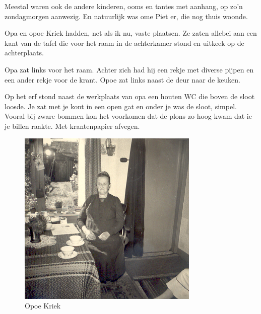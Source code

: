 \documentclass[12pt,twoside]{memoir}
\begin{document}
Meestal waren ook de andere kinderen, ooms en tantes met aanhang, op zo’n zondagmorgen aanwezig. En natuurlijk was ome Piet er, die nog thuis woonde. 

Opa en opoe Kriek hadden, net als ik nu, vaste plaatsen. Ze zaten allebei aan een kant van de tafel die voor het raam in de achterkamer stond en uitkeek op de achterplaats. 

Opa zat links voor het raam. Achter zich had hij een rekje met diverse pijpen en een ander rekje voor de krant. Opoe zat links naast de deur naar de keuken.

Op het erf stond naast de werkplaats van opa een houten WC die boven de sloot loosde. Je zat met je kont in een open gat en onder je was de sloot, simpel. Vooral bij zware bommen kon het voorkomen dat de plons zo hoog kwam dat ie je billen raakte. Met krantenpapier afvegen.

\begin{figure}
\includegraphics[width=\textwidth]{img/ch3/opoekriek}
\caption*{\footnotesize Opoe Kriek}
\end{figure}
\end{document}
